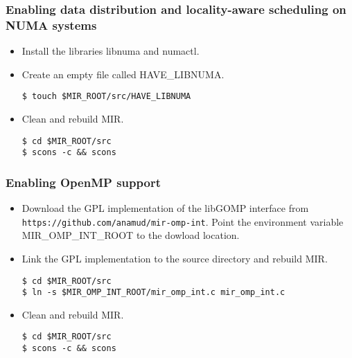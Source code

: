 \documentclass[11pt,a4paper]{article}
\begin{document}
\subsubsection{Enabling data distribution and locality-aware scheduling on NUMA systems}\label{enabling-data-distribution-and-locality-aware-scheduling-on-numa-systems}

\begin{itemize}
    \item Install the libraries libnuma and numactl.
    \item Create an empty file called HAVE\_LIBNUMA.

\begin{lstlisting}[style=MyInputStyle]
$ touch $MIR_ROOT/src/HAVE_LIBNUMA
\end{lstlisting}

    \item Clean and rebuild MIR.

\begin{lstlisting}[style=MyInputStyle]
$ cd $MIR_ROOT/src
$ scons -c && scons
\end{lstlisting}
\end{itemize}

\subsubsection{Enabling OpenMP support}\label{enable-omp-support}

\begin{itemize}
    \item Download the GPL implementation of the libGOMP interface from
        \texttt{https://github.com/anamud/mir-omp-int}.  Point the environment
        variable MIR\_OMP\_INT\_ROOT to the dowload location.

\item Link the GPL implementation to the source directory and rebuild MIR.

\begin{lstlisting}[style=MyInputStyle]
$ cd $MIR_ROOT/src
$ ln -s $MIR_OMP_INT_ROOT/mir_omp_int.c mir_omp_int.c
\end{lstlisting}

\item Clean and rebuild MIR.

\begin{lstlisting}[style=MyInputStyle]
$ cd $MIR_ROOT/src
$ scons -c && scons
\end{lstlisting}
\end{itemize}
\end{document}

